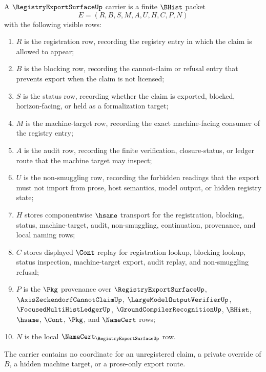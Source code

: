 \begin{definition}
\label{def:registry-export-surface-carrier}
A $\RegistryExportSurfaceUp$ carrier is a finite $\BHist$ packet
$$
E=(R,B,S,M,A,U,H,C,P,N)
$$
with the following visible rows:
\begin{enumerate}
\item $R$ is the registration row, recording the registry entry in which the claim is allowed to appear;
\item $B$ is the blocking row, recording the cannot-claim or refusal entry that prevents export when the claim is not licensed;
\item $S$ is the status row, recording whether the claim is exported, blocked, horizon-facing, or held as a formalization target;
\item $M$ is the machine-target row, recording the exact machine-facing consumer of the registry entry;
\item $A$ is the audit row, recording the finite verification, closure-status, or ledger route that the machine target may inspect;
\item $U$ is the non-smuggling row, recording the forbidden readings that the export must not import from prose, host semantics, model output, or hidden registry state;
\item $H$ stores componentwise $\hsame$ transport for the registration, blocking, status, machine-target, audit, non-smuggling, continuation, provenance, and local naming rows;
\item $C$ stores displayed $\Cont$ replay for registration lookup, blocking lookup, status inspection, machine-target export, audit replay, and non-smuggling refusal;
\item $P$ is the $\Pkg$ provenance over $\RegistryExportSurfaceUp$, $\AxisZeckendorfCannotClaimUp$, $\LargeModelOutputVerifierUp$, $\FocusedMultiHistLedgerUp$, $\GroundCompilerRecognitionUp$, $\BHist$, $\hsame$, $\Cont$, $\Pkg$, and $\NameCert$ rows;
\item $N$ is the local $\NameCert_{\RegistryExportSurfaceUp}$ row.
\end{enumerate}
The carrier contains no coordinate for an unregistered claim, a private override of $B$, a hidden machine target, or a prose-only export route.
\end{definition}


